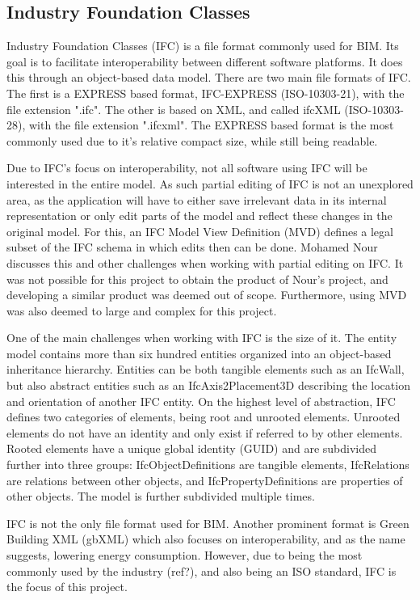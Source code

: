 \subsection{Industry Foundation Classes}
Industry Foundation Classes (IFC) is a file format commonly used for BIM. Its goal is to facilitate interoperability between different software platforms. It does this through an object-based data model. There are two main file formats of IFC. The first is a EXPRESS based format, IFC-EXPRESS (ISO-10303-21), with the file extension ".ifc". The other is based on XML, and called ifcXML (ISO-10303-28), with the file extension ".ifcxml". The EXPRESS based format is the most commonly used due to it's relative compact size, while still being readable. 

Due to IFC's focus on interoperability, not all software using IFC will be interested in the entire model. As such partial editing of IFC is not an unexplored area, as the application will have to either save irrelevant data in its internal representation or only edit parts of the model and reflect these changes in the original model. For this, an IFC Model View Definition (MVD) defines a legal subset of the IFC schema\cite{mvd} in which edits then can be done. Mohamed Nour discusses this and other challenges when working with partial editing on IFC\cite{nour08}. It was not possible for this project to obtain the product of Nour's project, and developing a similar product was deemed out of scope. Furthermore, using MVD was also deemed to large and complex for this project.

One of the main challenges when working with IFC is the size of it. The entity model contains more than six hundred entities organized into an object-based inheritance hierarchy. Entities can be both tangible elements such as an IfcWall, but also abstract entities such as an IfcAxis2Placement3D describing the location and orientation of another IFC entity. On the highest level of abstraction, IFC defines two categories of elements, being root and unrooted elements. Unrooted elements do not have an identity and only exist if referred to by other elements. Rooted elements have a unique global identity (GUID) and are subdivided further into three groups: IfcObjectDefinitions are tangible elements, IfcRelations are relations between other objects, and IfcPropertyDefinitions are properties of other objects. The model is further subdivided multiple times. 

IFC is not the only file format used for BIM. Another prominent format is Green Building XML (gbXML) which also focuses on interoperability, and as the name suggests, lowering energy consumption. However, due to being the most commonly used by the industry (ref?), and also being an ISO standard, IFC is the focus of this project.
